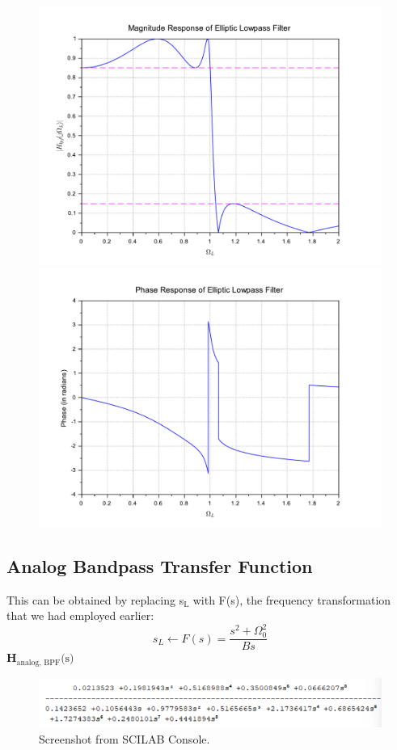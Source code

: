 \documentclass[12pt]{article}
\begin{document}
\begin{figure}[h]
    \begin{minipage}{0.49\linewidth}
        \centering
        \includegraphics[scale=0.36]{mag_lpf_bp.pdf}
    \end{minipage}
    \begin{minipage}{0.49\linewidth}
        \centering
        \includegraphics[scale=0.36]{phase_lpf_bp.pdf}
    \end{minipage}
\end{figure}
\newpage
\subsection{Analog Bandpass Transfer Function}
This can be obtained by replacing s$_\text{L}$ with F(s), the frequency transformation that we had employed earlier:
\[s_L \leftarrow F(s) = \frac{s^2 + \Omega_0^2}{Bs}\]
\textbf{H$_{\text{analog, BPF}}\text{(s)}$}
\begin{figure}[h]
    \centering
    \includegraphics[width=\textwidth]{h_int_bp.png}
    \caption{Screenshot from SCILAB Console.}
\end{figure}
\end{document}
